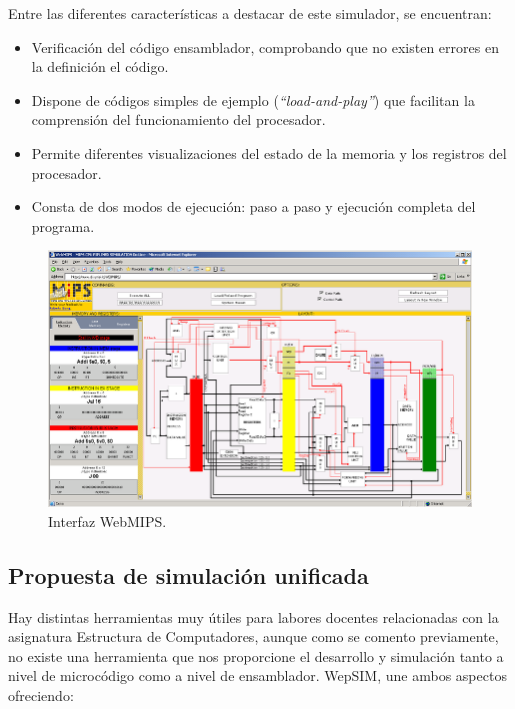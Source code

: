 Entre las diferentes características a destacar de este simulador, se encuentran:

\begin{itemize}
	
\item Verificación del código ensamblador, comprobando que no existen errores en la definición el código.

\item Dispone de códigos simples de ejemplo (\textit{``load-and-play''}) que facilitan la comprensión del funcionamiento del procesador.

\item Permite diferentes visualizaciones del estado de la memoria y los registros del procesador.

\item Consta de dos modos de ejecución: paso a paso y ejecución completa del programa.
	
\end{itemize}

\begin{figure}[htbp]
 	\centering
 	\includegraphics[width=15cm]{figures/webmips_figure}
 	\caption{ Interfaz WebMIPS.}
	\label{fig:webmips_figure}
\end{figure}

\clearpage

\subsection{Propuesta de simulación unificada}
\label{sec:propuesta_simulacion}
Hay distintas herramientas muy útiles para labores docentes relacionadas con la asignatura Estructura de Computadores, aunque como se comento previamente, no existe una herramienta que nos proporcione el desarrollo y simulación tanto a nivel de microcódigo como a nivel de ensamblador. WepSIM, une ambos aspectos ofreciendo:

